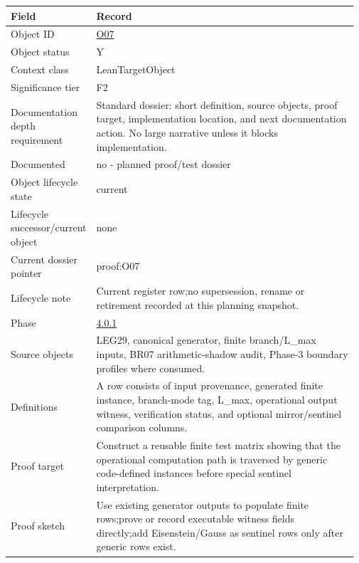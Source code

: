 \begin{longtable}{L{0.16\linewidth} L{0.81\linewidth}}
\hline
\textbf{Field} & \textbf{Record}\\
\hline
Object ID & \hyperlink{object-row-O07}{O07}\\
\hline\addlinespace[0.20em]
Object status & Y\\
\hline\addlinespace[0.20em]
Context class & LeanTargetObject\\
\hline\addlinespace[0.20em]
Significance tier & F2\\
\hline\addlinespace[0.20em]
Documentation depth requirement & Standard dossier: short definition, source objects, proof target, implementation location, and next documentation action. No large narrative unless it blocks implementation.\\
\hline\addlinespace[0.20em]
Documented & no - planned proof/\allowbreak{}test dossier\\
\hline\addlinespace[0.20em]
Object lifecycle state & current\\
\hline\addlinespace[0.20em]
Lifecycle successor/\allowbreak{}current object & none\\
\hline\addlinespace[0.20em]
Current dossier pointer & proof:O07\\
\hline\addlinespace[0.20em]
Lifecycle note & Current register row;\newline no supersession, rename or retirement recorded at this planning snapshot.\\
\hline\addlinespace[0.20em]
Phase & \hyperlink{phase-row-4-0-1}{4.0.1}\\
\hline\addlinespace[0.20em]
Source objects & LEG29, canonical generator, finite branch/\allowbreak{}L\_max inputs, BR07 arithmetic-shadow audit, Phase-3 boundary profiles where consumed.\\
\hline\addlinespace[0.20em]
Definitions & A row consists of input provenance, generated finite instance, branch-mode tag, L\_max, operational output witness, verification status, and optional mirror/\allowbreak{}sentinel comparison columns.\\
\hline\addlinespace[0.20em]
Proof target & Construct a reusable finite test matrix showing that the operational computation path is traversed by generic code-defined instances before special sentinel interpretation.\\
\hline\addlinespace[0.20em]
Proof sketch & Use existing generator outputs to populate finite rows;\newline prove or record executable witness fields directly;\newline add Eisenstein/\allowbreak{}Gauss as sentinel rows only after generic rows exist.\\

\end{longtable}
